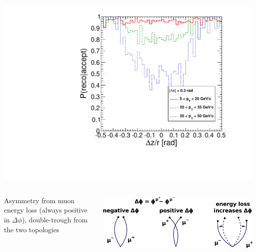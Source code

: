 \documentclass[compress]{beamer}
\begin{document}
\begin{frame}
\begin{columns}
\includegraphics[width=\linewidth]{barrel_dz_bypt_StandAloneMuon.pdf}
\end{columns}

\begin{columns}

\vspace{0.15 cm}
Asymmetry from muon energy loss (always positive in $\Delta \phi$),
double-trough from the two topologies

\vspace{-0.3 cm}
\centering \includegraphics[width=\linewidth]{signs.pdf}
\end{columns}
\end{frame}




\end{document}

